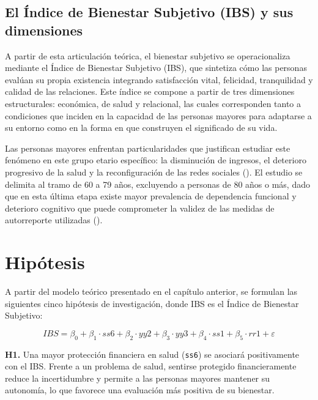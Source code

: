 \documentclass[
  spanish,
  a4paper,
  oneside]{scrbook}
\begin{document}
\section{El Índice de Bienestar Subjetivo (IBS) y sus
dimensiones}\label{el-uxedndice-de-bienestar-subjetivo-ibs-y-sus-dimensiones}

A partir de esta articulación teórica, el bienestar subjetivo se
operacionaliza mediante el Índice de Bienestar Subjetivo (IBS), que
sintetiza cómo las personas evalúan su propia existencia integrando
satisfacción vital, felicidad, tranquilidad y calidad de las relaciones.
Este índice se compone a partir de tres dimensiones estructurales:
económica, de salud y relacional, las cuales corresponden tanto a
condiciones que inciden en la capacidad de las personas mayores para
adaptarse a su entorno como en la forma en que construyen el significado
de su vida.

Las personas mayores enfrentan particularidades que justifican estudiar
este fenómeno en este grupo etario específico: la disminución de
ingresos, el deterioro progresivo de la salud y la reconfiguración de
las redes sociales (). El
estudio se delimita al tramo de 60 a 79 años, excluyendo a personas de
80 años o más, dado que en esta última etapa existe mayor prevalencia de
dependencia funcional y deterioro cognitivo que puede comprometer la
validez de las medidas de autorreporte utilizadas
().


\chapter{Hipótesis}\label{hipuxf3tesis}

A partir del modelo teórico presentado en el capítulo anterior, se
formulan las siguientes cinco hipótesis de investigación, donde IBS es
el Índice de Bienestar Subjetivo:

\[IBS = \beta_0 + \beta_1 \cdot ss6 + \beta_2 \cdot yy2 + \beta_3 \cdot yy3 + \beta_4 \cdot ss1 + \beta_5 \cdot rr1 + \varepsilon\]

\textbf{H1.} Una mayor protección financiera en salud (\texttt{ss6}) se
asociará positivamente con el IBS. Frente a un problema de salud,
sentirse protegido financieramente reduce la incertidumbre y permite a
las personas mayores mantener su autonomía, lo que favorece una
evaluación más positiva de su bienestar.
\end{document}
